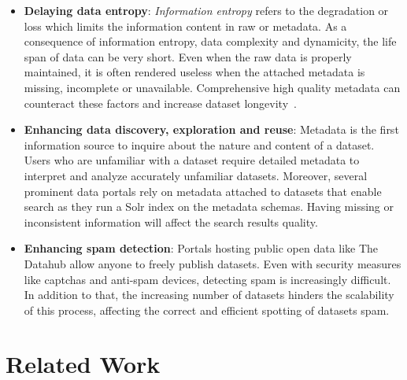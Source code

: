 \documentclass[runningheads,a4paper]{llncs}
\begin{document}
\begin{itemize}
  \item \textbf{Delaying data entropy}: \textit{Information entropy} refers to the degradation or loss which limits the information content in raw or metadata. As a consequence of information entropy, data complexity and dynamicity, the life span of data can be very short. Even when the raw data is properly maintained, it is often rendered useless when the attached metadata is missing, incomplete or unavailable. Comprehensive high quality metadata can counteract these factors and increase dataset longevity~\cite{GTOS}.
  \item \textbf{Enhancing data discovery, exploration and reuse}: Metadata is the first information source to inquire about the nature and content of a dataset. Users who are unfamiliar with a dataset require detailed metadata to interpret and analyze accurately unfamiliar datasets. Moreover, several prominent data portals rely on metadata attached to datasets that enable search as they run a Solr index on the metadata schemas. Having missing or inconsistent information will affect the search results quality.
  \item \textbf{Enhancing spam detection}: Portals hosting public open data like The Datahub allow anyone to freely publish datasets. Even with security measures like captchas and anti-spam devices, detecting spam is increasingly difficult. In addition to that, the increasing number of datasets hinders the scalability of this process, affecting the correct and efficient spotting of datasets spam.
\end{itemize}

\section{Related Work}
\label{sec:related-work}
\end{document}
